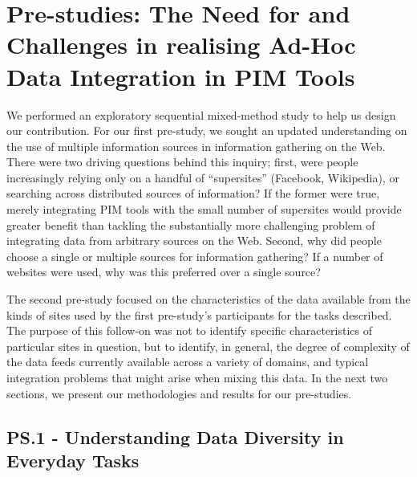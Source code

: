 \documentclass{sigchi}
\begin{document}
\section{Pre-studies: The Need for and Challenges in realising Ad-Hoc Data Integration in PIM Tools}


We performed an exploratory sequential mixed-method study to help us design our contribution. For our first pre-study, we sought an updated understanding on the use of multiple information sources in information gathering on the Web. There were two driving questions behind this inquiry; first, were people increasingly relying only on a handful of ``supersites'' (Facebook, Wikipedia), or searching across distributed sources of information?  If the former were true, merely integrating PIM tools with the small number of supersites would provide greater benefit than tackling the substantially more challenging problem of integrating data from arbitrary sources on the Web.  Second, why did people choose a single or multiple sources for information gathering?  If a number of websites were used, why was this preferred over a single source?


The second pre-study focused on the characteristics of the data available from the kinds of sites used by the first pre-study's participants for the tasks described. The purpose of this follow-on was not to identify specific characteristics of particular sites in question, but to identify, in general, the degree of complexity of the data feeds currently available across a variety of domains, and typical integration problems that might arise when mixing this data.  In the next two sections, we present our methodologies and results for our pre-studies.


\subsection{PS.1 - Understanding Data Diversity in Everyday Tasks}
\end{document}
